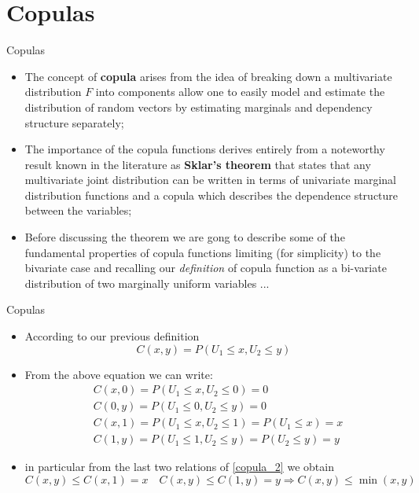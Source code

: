 \documentclass[11pt]{beamer}
\theoremstyle{plain}
\theoremstyle{definition}
\theoremstyle{remark}
\begin{document}
\section{Copulas}
%
\begin{frame}{Copulas}
   \begin{itemize}
   		\item The concept of \textbf{copula} arises from the idea of breaking down a multivariate distribution $F$ into components allow one 
   		to easily model and estimate the distribution of random vectors by estimating marginals and dependency structure separately;
	  	\item The importance of the copula functions derives entirely from a noteworthy result known in the literature as \textbf{Sklar's 
	  	theorem} that states that any multivariate joint distribution can be written in terms of univariate marginal distribution functions and a 
	  	copula which describes the dependence structure between the variables;
	 	\item Before discussing the theorem we are gong to describe some of the fundamental properties of copula functions limiting (for 
	 	simplicity) to the bivariate case and recalling our \textit{definition} of copula function as a bi-variate distribution of two marginally 
	 	uniform variables ...
   \end{itemize}
\end{frame}
%
\begin{frame}{Copulas}
  \footnotesize{
   \begin{itemize}
      \item   				  						  
			According to our previous definition
			\begin{equation}\label{copula_1}
				C(x,y) = P(U_1 \le x, U_2 \le y)
			\end{equation}		 
	  \item From the above equation we can write:
			  \begin{equation}\label{copula_2}
					  \begin{split}
					  &C(x,0) = P(U_1 \le x, U_2 \le 0) = 0 \\
					  &C(0,y) = P(U_1 \le 0, U_2 \le y) = 0 \\
					  &C(x,1) = P(U_1 \le x, U_2 \le 1) = P(U_1 \le x) = x \\
				      &C(1,y) = P(U_1 \le 1, U_2 \le y) = P(U_2 \le y) = y	   
					  \end{split}	   
			  \end{equation}
	\item in particular from the last two relations of \eqref{copula_2} we obtain
			\begin{equation}\label{copula_3}
					C(x,y) \le C(x,1) = x \quad C(x,y) \le C(1,y) = y \Rightarrow C(x,y) \le \min(x,y)
			\end{equation}
   \end{itemize}
 }
\end{frame}
\end{document}
